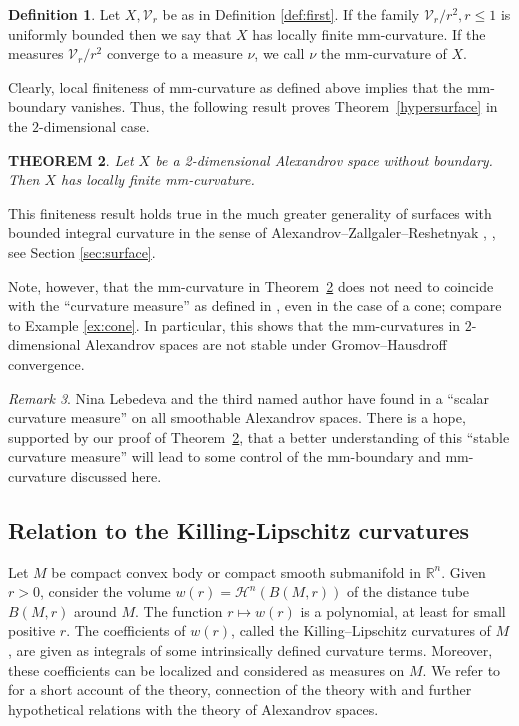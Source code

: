\documentclass[12pt,leqno,intlimits]{amsart}
\numberwithin{equation}{section}
\newtheorem{thm}{THEOREM}[section]
\theoremstyle{definition}
\newtheorem{defn}[thm]{Definition}%
\theoremstyle{remark}
\newtheorem{rem}[thm]{Remark}
\newcommand{\tref}[1]{Theorem~\ref{#1}}
\newcommand{\R}{\mathbb{R}}
\begin{document}
\begin{defn}
Let $X,\mathcal{V}_r$ be as in Definition \ref{def:first}.
If the family $\mathcal{V}_r /r^2, r\leq 1$ is uniformly bounded then we say that $X$ has locally finite mm-curvature.
If the measures $\mathcal{V}_r /r^2$ converge to a measure $\nu$, we call $\nu$ the mm-curvature of $X$.
\end{defn}

Clearly, local finiteness of mm-curvature as defined above implies that the mm-boundary vanishes.
Thus, the following result proves \tref{hypersurface} in the $2$-dimensional case.

\begin{thm} \label{intsurface}
Let $X$ be a 2-dimensional Alexandrov space without boundary.
Then $X$ has locally finite mm-curvature.
\end{thm}

This finiteness result holds true in the much greater generality of surfaces with bounded integral curvature in the sense of Alexandrov--Zallgaler--Reshetnyak \cite{Reshetnyak-GeomIV}, \cite{AZ}, see Section \ref{sec:surface}.

Note, however, that the mm-curvature
in \tref{intsurface} does not need to coincide with the ``curvature measure'' as defined in \cite{AZ}, even in the case of a cone; compare to Example \ref{ex:cone}.
In particular, this shows that the mm-curvatures in $2$-dimensional Alexandrov spaces are not stable under Gromov--Hausdroff convergence.

\begin{rem}
Nina Lebedeva and the third named author have found in \cite{LP} a ``scalar curvature measure'' on all smoothable Alexandrov spaces.
There is a hope, supported by our proof of \tref{intsurface}, that a better understanding of this ``stable curvature measure'' will
lead to some control of the mm-boundary and mm-curvature discussed here.
\end{rem}
\subsection{Relation to the Killing-Lipschitz curvatures} Let $M$ be compact convex body or compact smooth submanifold in $\R^n$.
Given $r>0$, consider the volume $w(r)=\mathcal H^n (B(M,r))$ of the distance tube $B(M,r)$ around $M$.
The function $r\mapsto w(r)$ is a polynomial, at least for small positive $r$. The coefficients of $w(r)$,  called the Killing--Lipschitz curvatures of $M$, are given as integrals of some intrinsically defined curvature terms.
Moreover, these coefficients can be localized and considered as measures on $M$.
We refer to \cite{Alesker} for a short account of the theory, connection of the theory with
\cite{LP} and further hypothetical relations with the theory of Alexandrov spaces.
\end{document}
